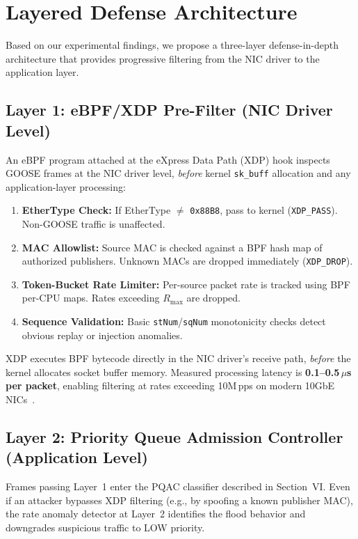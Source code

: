 \documentclass{ieeeaccess}
\begin{document}
\section{Layered Defense Architecture}

Based on our experimental findings, we propose a three-layer defense-in-depth architecture that provides progressive filtering from the NIC driver to the application layer.

\subsection{Layer 1: eBPF/XDP Pre-Filter (NIC Driver Level)}
An eBPF program attached at the eXpress Data Path (XDP) hook inspects GOOSE frames at the NIC driver level, \emph{before} kernel \texttt{sk\_buff} allocation and any application-layer processing:

\begin{enumerate}[leftmargin=*]
    \item \textbf{EtherType Check:} If EtherType $\ne$ \texttt{0x88B8}, pass to kernel (\texttt{XDP\_PASS}). Non-GOOSE traffic is unaffected.
    \item \textbf{MAC Allowlist:} Source MAC is checked against a BPF hash map of authorized publishers. Unknown MACs are dropped immediately (\texttt{XDP\_DROP}).
    \item \textbf{Token-Bucket Rate Limiter:} Per-source packet rate is tracked using BPF per-CPU maps. Rates exceeding $R_{\max}$ are dropped.
    \item \textbf{Sequence Validation:} Basic \texttt{stNum}/\texttt{sqNum} monotonicity checks detect obvious replay or injection anomalies.
\end{enumerate}

XDP executes BPF bytecode directly in the NIC driver's receive path, \emph{before} the kernel allocates socket buffer memory. Measured processing latency is \textbf{0.1--0.5\,$\mu$s per packet}, enabling filtering at rates exceeding 10M\,pps on modern 10GbE NICs~\cite{hoevik2015ebpf}.

\subsection{Layer 2: Priority Queue Admission Controller (Application Level)}
Frames passing Layer~1 enter the PQAC classifier described in Section~VI. Even if an attacker bypasses XDP filtering (e.g., by spoofing a known publisher MAC), the rate anomaly detector at Layer~2 identifies the flood behavior and downgrades suspicious traffic to LOW priority.
\end{document}

